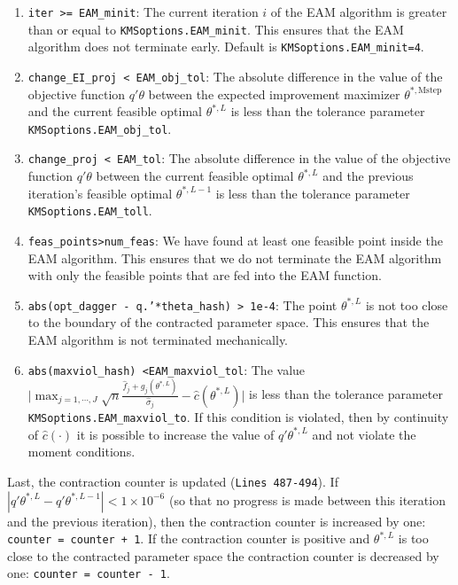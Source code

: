 \documentclass[12pt]{article}
\def\code#1{\texttt{#1}}
\begin{document}
\begin{enumerate}
\item \code{iter >= EAM\_minit}: The current iteration $i$ of the EAM algorithm is greater than or equal to \code{KMSoptions.EAM\_minit}.  This ensures that the EAM algorithm does not terminate early.  Default is \code{KMSoptions.EAM\_minit=4}.

\item \code{change\_EI\_proj < EAM\_obj\_tol}: The absolute difference in the value of the objective function $q'\theta$ between the expected improvement maximizer $\theta^{*,\text{Mstep}}$ and the current feasible optimal $\theta^{*,L}$ is less than  the tolerance parameter \code{KMSoptions.EAM\_obj\_tol}.

\item \code{change\_proj < EAM\_tol}: The absolute difference in the value of the objective function $q'\theta$ between the current feasible optimal $\theta^{*,L}$ and the previous iteration's feasible optimal $\theta^{*,L-1}$ is less than  the tolerance parameter \code{KMSoptions.EAM\_toll}.

\item \code{feas\_points>num\_feas}: We have found at least one feasible point inside the EAM algorithm.  This ensures that we do not terminate the EAM algorithm with only the feasible points that are fed into the EAM function.

\item \code{abs(opt\_dagger - q.'*theta\_hash) > 1e-4}: The point $\theta^{*,L}$ is not too close to the boundary of the contracted parameter space.  This ensures that the EAM algorithm is not terminated mechanically.

\item \code{abs(maxviol\_hash) <EAM\_maxviol\_tol}: The value $\bigg| \max_{j=1,\cdots,J} \sqrt{n} \frac{\hat f_j + g_j(\theta^{*,L})}{\hat \sigma_j} - \hat c(\theta^{*,L})\bigg|$ is less than the tolerance parameter \code{KMSoptions.EAM\_maxviol\_to}.  If this condition is violated, then by continuity of $\hat c(\cdot)$ it is possible to increase the value of $q'\theta^{*,L}$ and not violate the moment conditions.
\end{enumerate}

Last, the contraction counter is updated (\code{Lines 487-494}).  If $|q'\theta^{*,L} - q'\theta^{*,L-1}| < 1 \times 10^{-6}$ (so that no progress is made between this iteration and the previous iteration), then the contraction counter is increased by one: \code{counter = counter + 1}.  If the contraction counter is positive and $\theta^{*,L}$ is too close to the contracted parameter space the contraction counter is decreased by one: \code{counter = counter - 1}.
\end{document}
